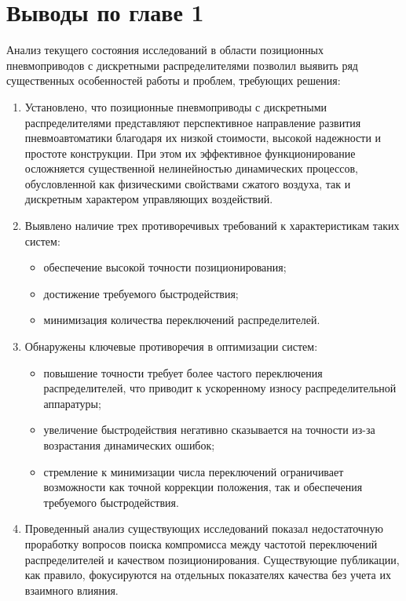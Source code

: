 \section{Выводы по главе 1}\label{sec:ch1/conclusion}

Анализ текущего состояния исследований в области позиционных пневмоприводов с
дискретными распределителями позволил выявить ряд существенных особенностей работы
и проблем, требующих решения:

\begin{enumerate}
	\item Установлено, что позиционные пневмоприводы с дискретными
	      распределителями представляют перспективное направление развития
	      пневмоавтоматики благодаря их низкой стоимости, высокой надежности
	      и простоте конструкции. При этом их эффективное функционирование
	      осложняется существенной нелинейностью динамических процессов,
	      обусловленной как физическими свойствами сжатого воздуха, так и
	      дискретным характером управляющих воздействий.

	\item Выявлено наличие трех противоречивых требований к характеристикам таких систем:
	      \begin{itemize}
		      \item обеспечение высокой точности позиционирования;
		      \item достижение требуемого быстродействия;
		      \item минимизация количества переключений распределителей.
	      \end{itemize}

	\item Обнаружены ключевые противоречия в оптимизации систем:
	      \begin{itemize}
		      \item повышение точности требует более частого переключения
		            распределителей, что приводит к ускоренному износу распределительной аппаратуры;
		      \item увеличение быстродействия негативно сказывается на
		            точности из-за возрастания динамических ошибок;
		      \item стремление к минимизации числа переключений
		            ограничивает возможности как точной коррекции положения, так и обеспечения требуемого быстродействия.
	      \end{itemize}

	\item Проведенный анализ существующих исследований показал
	      недостаточную проработку вопросов поиска компромисса между
	      частотой переключений распределителей и качеством позиционирования.
	      Существующие публикации, как правило, фокусируются на отдельных показателях качества без учета их взаимного влияния.


\end{enumerate}
